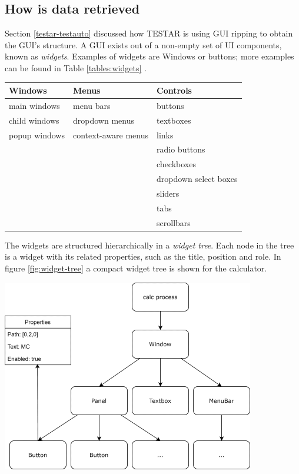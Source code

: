 \subsection{How is data retrieved} \label{data-retrieval}

Section \ref{testar-testauto} discussed how TESTAR is using GUI ripping to obtain the GUI's structure. A GUI exists out of a non-empty set of UI components, known as \emph{widgets}. Examples of widgets are Windows or buttons; more examples can be found in Table \ref{tables:widgets} \cite{VosAho2021}. 

\begingroup
\captionsetup{type=table}
\begin{tabularx}{\textwidth}{ 
  | >{\raggedright\arraybackslash}X 
  | >{\raggedright\arraybackslash}X 
  | >{\raggedright\arraybackslash}X | }
    \hline
    Windows & Menus & Controls \\
    \hline
    \hline
    main windows & menu bars & buttons \\
    child windows & dropdown menus & textboxes \\
    popup windows & context-aware menus & links \\
    && radio buttons \\
    && checkboxes\\
    && dropdown select boxes\\
    && sliders\\
    && tabs\\
    && scrollbars \\
    \hline
\end{tabularx}
\label{tables:widgets}
\endgroup

The widgets are structured hierarchically in a \emph{widget tree}. Each node in the tree is a widget with its related properties, such as the title, position and role. In figure \ref{fig:widget-tree} a compact widget tree is shown for the calculator. 

\begingroup
\captionsetup{type=figure}
\includegraphics{pics/calc-tree.png}
\label{fig:widget-tree}
\endgroup

